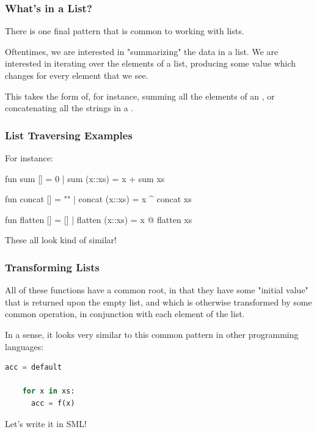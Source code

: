 \documentclass[aspectratio=169]{beamer}
\begin{document}
\begin{frame}[fragile]
  \frametitle{What's in a List?}

  There is one final pattern that is common to working with lists.

  \pause
  \vspace{\fill}

  Oftentimes, we are interested in "summarizing" the data in a list. We are
  interested in iterating over the elements of a list, producing some value which
  changes for every element that we see.

  \pause
  \vspace{\fill}

  This takes the form of, for instance, summing all the elements of an ,
  or concatenating all the strings in a .
\end{frame}

\begin{frame}[fragile]
  \frametitle{List Traversing Examples}

  For instance:

  \pause
  \begin{codeblock}
    fun sum [] = 0
      | sum (x::xs) = x + sum xs

    fun concat [] = ""
      | concat (x::xs) = x ^ concat xs

    fun flatten [] = []
      | flatten (x::xs) = x @ flatten xs
  \end{codeblock}

  \pause
  \vspace{\fill}

  These all look kind of similar!
\end{frame}

\begin{frame}[fragile]
  \frametitle{Transforming Lists}

  All of these functions have a common root, in that they have some "initial value"
  that is returned upon the empty list, and which is otherwise transformed by some
  common operation, in conjunction with each element of the list.

  \pause
  \vspace{\fill}

  In a sense, it looks very similar to this common pattern in other programming
  languages:

  \begin{lstlisting}[language=Python]
    acc = default

    for x in xs:
      acc = f(x)
  \end{lstlisting}

  \pause
  \vspace{\fill}

  Let's write it in SML!
\end{frame}
\end{document}
